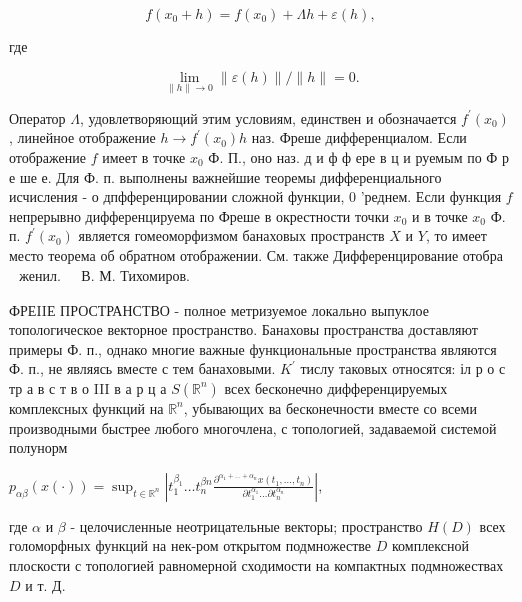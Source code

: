 \documentclass[10pt]{article}
\begin{document}
\[

f\left(x_{0}+h\right)=f\left(x_{0}\right)+\Lambda h+\varepsilon(h),

\]



где



\[

\lim _{\|h\| \rightarrow 0}\|\varepsilon(h)\| /\|h\|=0 .

\]



Оператор $\Lambda$, удовлетворяющий этим условиям, единствен и обозначается $f^{\prime}\left(x_{0}\right)$, линейное отображение $h \rightarrow f^{\prime}\left(x_{0}\right) h$ наз. Фреше дифференциалом. Если отображение $f$ имеет в точке $x_{0}$ Ф. П., оно наз. д и ф ф ере в ц и руемым по Ф р е ше е. Для Ф. п. выполнены важнейшие теоремы дифференциального исчисления - о дпфференцировании сложной функции, 0 'реднем. Если функция $f$ непрерывно дифференцируема по Фреше в окрестности точки $x_{0}$ и в точке $x_{0}$ Ф. п. $f^{\prime}\left(x_{0}\right)$ является гомеоморфизмом банаховых пространств $X$ и $Y$, то имеет место теорема об обратном отображении. См. также Дифференцирование отобра$\begin{array}{ll}\text { женил. } & \text { В. М. Тихомиров. }\end{array}$



ФРЕIIЕ ПРОСТРАНСТВО - полное метризуемое локально выпуклое топологическое векторное пространство. Банаховы пространства доставляют примеры Ф. п., однако многие важные функциональные пространства являются Ф. п., не являясь вместе с тем банаховыми. $K^{\prime}$ тислу таковых относятся: іл р о с тр а в с т в о III в а р ц а $S\left(\mathbb{R}^{n}\right)$ всех бесконечно дифференцируемых комплексных функций на $\mathbb{R}^{n}$, убывающих ва бесконечности вместе со всеми производными быстрее любого многочлена, с топологией, задаваемой системой полунорм



$p_{\alpha \beta}(x(\cdot))=\sup _{t \in \mathbb{R}^{n}}\left|t_{1}^{\beta_{1}} \ldots t_{n}^{\beta n} \frac{\partial^{\alpha_{1}+\ldots+\alpha_{n}} x\left(t_{1}, \ldots, t_{n}\right)}{\partial t_{1}^{\alpha_{1}} \ldots \partial t_{n}^{\alpha_{n}}}\right|$,



где $\alpha$ и $\beta$ - целочисленные неотрицательные векторы; пространство $H(D)$ всех голоморфных функций на нек-ром открытом подмножестве $D$ комплексной плоскости с топологией равномерной сходимости на компактных подмножествах $D$ и т. Д.
\end{document}
